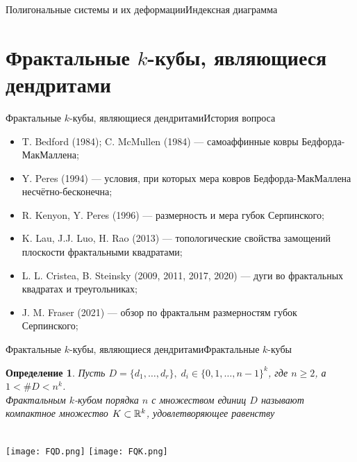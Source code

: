 \documentclass[aspectratio=1610, 10pt, notheorems]{beamer}
\newtheorem{definition}  {Определение}
\begin{document}
\begin{frame}{Полигональные системы и их деформации}{Индексная диаграмма}

\end{frame}



\section{Фрактальные $k$-кубы, являющиеся дендритами}


\begin{frame}{Фрактальные $k$-кубы, являющиеся дендритами}{История вопроса}
\begin{itemize}
    \item T. Bedford (1984); C. McMullen (1984) --- самоаффинные ковры Бедфорда-МакМаллена;
    \item Y. Peres (1994) --- условия, при которых мера ковров Бедфорда-МакМаллена несчётно-бесконечна;
    \item R. Kenyon, Y. Peres (1996) --- размерность и мера губок Серпинского;
    \item K. Lau, J.J. Luo, H. Rao (2013) --- топологические свойства замощений плоскости фрактальными квадратами;
    \item L. L. Cristea, B. Steinsky (2009, 2011, 2017, 2020) --- дуги во фрактальных квадратах и треугольниках;
    \item J. M. Fraser (2021) --- обзор по фрактальнм размерностям губок Серпинского;
\end{itemize}
\end{frame}


\begin{frame}{Фрактальные $k$-кубы, являющиеся дендритами}{Фрактальные $k$-кубы}

\begin{definition}
Пусть  $D=\{d_1,\ldots,d_r\},\; d_i\in\{0,1,\ldots,n-1\}^k$, где $n\ge 2$, а $1<\#D<n^k$.\\
{\em Фрактальным $k$-кубом порядка $n$ с множеством единиц $D$} называют компактное множество $K\subset\mathbb{R}^k$, удовлетворяющее равенству\\
\end{definition}
\;\\
\qquad\qquad
\texttt{[image: FQD.png]}
\hfill
\texttt{[image: FQK.png]}
\qquad\qquad
\end{frame}
\end{document}
